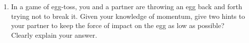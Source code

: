 \begin{enumerate}[itemsep=6pt]
%  
%  
  
\item In a game of egg-toss, you and a partner are throwing an egg back and
  forth trying not to break it. Given your knowledge of momentum, give two
  hints to your partner to keep the force of impact on the egg as low as
  possible? Clearly explain your answer.

  

\end{enumerate}
